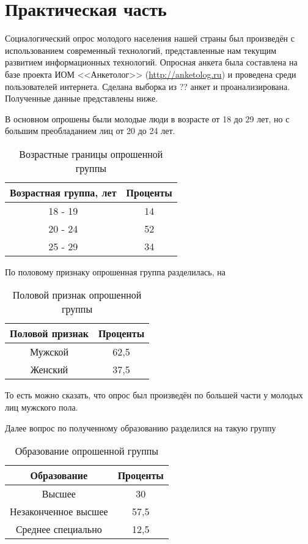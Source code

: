 \section{Практическая часть}

Социалогический опрос молодого населения нашей страны был произведён с 
использованием современный технологий, представленные нам текущим развитием 
информационных технологий. Опросная анкета была составлена на базе проекта 
ИОМ <<Анкетолог>> (\url{http://anketolog.ru}) и проведена среди пользователей 
интернета. Сделана выборка из ?? анкет и проанализирована. Полученные данные 
представлены ниже.

В основном опрошены были молодые люди в возрасте от 18 до 29 лет, но с большим 
преобладанием лиц от 20 до 24 лет.

\begin{table}[H]
    \centering
    \begin{tabular}{|c|c|}
        \hline
        Возрастная группа, лет & Проценты \\ \hline \hline
        18 - 19 & 14 \\ \hline
        20 - 24 & 52 \\ \hline
        25 - 29 & 34 \\ \hline
    \end{tabular}
    \caption{Возрастные границы опрошенной группы}
    \label{table:01}
\end{table}

По половому признаку опрошенная группа разделилась, на 
\begin{table}[H]
    \centering
    \begin{tabular}{|c|c|}
        \hline
        Половой признак & Проценты \\ \hline \hline
        Мужской & 62,5 \\ \hline
        Женский & 37,5 \\ \hline
    \end{tabular}
    \caption{Половой признак опрошенной группы}
\end{table}

То есть можно сказать, что опрос был произведён по большей части у молодых 
лиц мужского пола.

Далее вопрос по полученному образованию разделился на такую группу
\begin{table}[H]
    \centering
    \begin{tabular}{|c|c|}
        \hline
        Образование & Проценты \\ \hline \hline
        Высшее & 30 \\ \hline
        Незаконченное высшее & 57,5 \\ \hline
        Среднее специально & 12,5 \\ \hline
    \end{tabular}
    \caption{Образование опрошенной группы}
\end{table}

